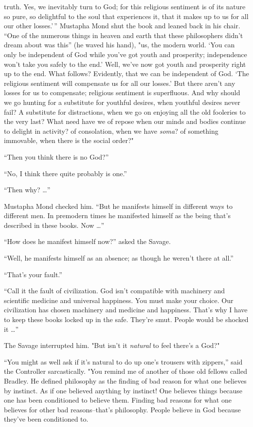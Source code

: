 \documentclass[12pt]{report}
\begin{document}
truth. Yes, we inevitably turn to God; for this religious sentiment is
of its nature so pure, so delightful to the soul that experiences it,
that it makes up to us for all our other losses.'\,'' Mustapha Mond shut
the book and leaned back in his chair. ``One of the numerous things in
heaven and earth that these philosophers didn't dream about was this''
(he waved his hand), "us, the modern world. `You can only be independent
of God while you've got youth and prosperity; independence won't take
you safely to the end.' Well, we've now got youth and prosperity right
up to the end. What follows? Evidently, that we can be independent of
God. `The religious sentiment will compensate us for all our losses.'
But there aren't any losses for us to compensate; religious sentiment is
superfluous. And why should we go hunting for a substitute for youthful
desires, when youthful desires never fail? A substitute for
distractions, when we go on enjoying all the old fooleries to the very
last? What need have we of repose when our minds and bodies continue to
delight in activity? of consolation, when we have \emph{soma}? of
something immovable, when there is the social order?"

``Then you think there is no God?''

``No, I think there quite probably is one.''

``Then why? \ldots{}''

Mustapha Mond checked him. ``But he manifests himself in different ways
to different men. In premodern times he manifested himself as the being
that's described in these books. Now \ldots{}''

``How does he manifest himself now?'' asked the Savage.

``Well, he manifests himself as an absence; as though he weren't there
at all.''

``That's your fault.''

``Call it the fault of civilization. God isn't compatible with machinery
and scientific medicine and universal happiness. You must make your
choice. Our civilization has chosen machinery and medicine and
happiness. That's why I have to keep these books locked up in the safe.
They're smut. People would be shocked it \ldots{}''

The Savage interrupted him. "But isn't it \emph{natural} to feel there's
a God?"

``You might as well ask if it's natural to do up one's trousers with
zippers,'' said the Controller sarcastically. "You remind me of another
of those old fellows called Bradley. He defined philosophy as the
finding of bad reason for what one believes by instinct. As if one
believed anything by instinct! One believes things because one has been
conditioned to believe them. Finding bad reasons for what one believes
for other bad reasons--that's philosophy. People believe in God because
they've been conditioned to.
\end{document}
